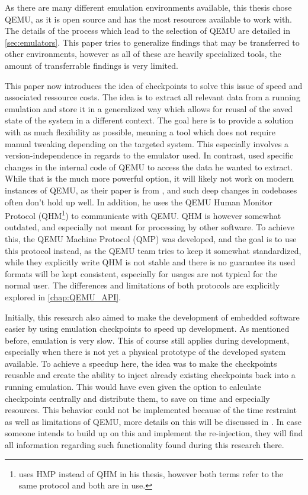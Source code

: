 As there are many different emulation environments available,
this thesis chose QEMU, as it is open source and has the most resources available to work with.
The details of the process which lead to the selection of QEMU are detailed in \autoref{sec:emulators}.
This paper tries to generalize findings that may be transferred to other environments,
however as all of these are heavily specialized tools,
the amount of transferrable findings is very limited.

This paper now introduces the idea of checkpoints to solve this issue of speed and associated ressource costs.
The idea is to extract all relevant data from a running emulation
and store it in a generalized way which allows for reusal of the saved state of the system in a different context.
The goal here is to provide a solution with as much flexibility as possible,
meaning a tool which does not require manual tweaking depending on the targeted system.
This especially involves a version-independence in regards to the emulator used.
In contrast,  used specific changes in the internal code of QEMU
to access the data he wanted to extract.
While that is the much more powerful option, it will likely not work on modern instances of QEMU,
as their paper is from \citeyear{kitcheckpoints}, and such deep changes in codebases often don't hold up well.
In addition, he uses the QEMU Human Monitor Protocol (QHM\footnote{ uses HMP instead of QHM in his thesis, however both terms refer to the same protocol and both are in use.}) to communicate with QEMU.
QHM is however somewhat outdated, and especially not meant for processing by other software.
To achieve this, the QEMU Machine Protocol (QMP) was developed, and the goal is to use this protocol instead,
as the QEMU team tries to keep it somewhat standardized,
while they explicitly write QHM is not stable and there is no guarantee its used formats will be kept consistent,
especially for usages are not typical for the normal user.
The differences and limitations of both protocols are explicitly explored in \autoref{chap:QEMU_API}.

Initially, this research also aimed to make the development of embedded software easier by using emulation checkpoints to speed up development.
As mentioned before, emulation is very slow.
This of course still applies during development, especially when there is not yet a physical prototype of the developed system available.
To achieve a speedup here, the idea was to make the checkpoints reusable
and create the ability to inject already existing checkpoints back into a running emulation.
This would have even given the option to calculate checkpoints centrally and distribute them,
to save on time and especially resources.
This behavior could not be implemented because of the time restraint as well as limitations of QEMU,
more details on this will be discussed in .
In case someone intends to build up on this and implement the re-injection,
they will find all information regarding such functionality found during this research there.